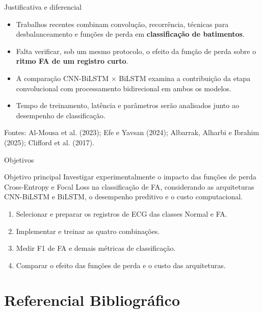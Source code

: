 \documentclass[aspectratio=169,12pt,brazil]{beamer}
\begin{document}
\begin{frame}{Justificativa e diferencial}
  \begin{itemize}
    \item Trabalhos recentes combinam convolução, recorrência, técnicas para desbalanceamento e funções de perda em \textbf{classificação de batimentos}.
    \item Falta verificar, sob um mesmo protocolo, o efeito da função de perda sobre o \textbf{ritmo FA de um registro curto}.
    \item A comparação CNN-BiLSTM × BiLSTM examina a contribuição da etapa convolucional com processamento bidirecional em ambos os modelos.
    \item Tempo de treinamento, latência e parâmetros serão analisados junto ao desempenho de classificação.
  \end{itemize}
  {\scriptsize Fontes: Al-Mousa et al. (2023); Efe e Yavsan (2024); Albarrak, Alharbi e Ibrahim (2025); Clifford et al. (2017).}
\end{frame}

\begin{frame}{Objetivos}
  \begin{block}{Objetivo principal}
    Investigar experimentalmente o impacto das
    funções de perda Cross-Entropy e Focal Loss
    na classificação de FA, considerando as
    arquiteturas CNN-BiLSTM e BiLSTM, o desempenho
    preditivo e o custo computacional.
  \end{block}
  \begin{enumerate}
    \item Selecionar e preparar os registros de ECG das classes Normal e FA.
    \item Implementar e treinar as quatro combinações.
    \item Medir F1 de FA e demais métricas de classificação.
    \item Comparar o efeito das funções de perda e o custo das arquiteturas.
  \end{enumerate}
\end{frame}

\section{Referencial Bibliográfico}
\end{document}
